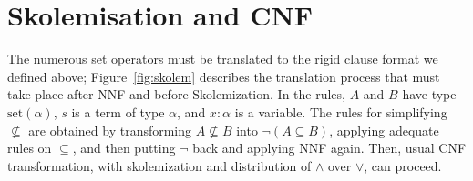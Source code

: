\documentclass{article}
\newcommand{\set}[1]{\ensuremath{\text{set}({#1})}}
\begin{document}
\section{Skolemisation and CNF}
The numerous set operators must be translated to the rigid clause format
we defined above; Figure~\ref{fig:skolem} describes the translation process
that must take place after NNF and before Skolemization.
In the rules, $A$ and $B$ have type $\set{\alpha}$, $s$ is a term
of type $\alpha$, and $x:\alpha$ is a
variable. The rules for simplifying $\not\subseteq$ are obtained by
transforming $A \not\subseteq B$ into $\lnot(A \subseteq B)$, applying
adequate rules on $\subseteq$, and then putting $\lnot$ back and
applying NNF again. Then, usual CNF transformation, with skolemization
and distribution of $\land$ over $\lor$, can proceed.
\end{document}
